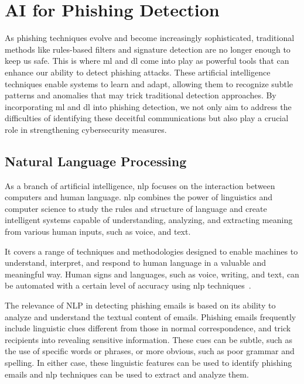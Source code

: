 
\section{AI for Phishing Detection}


As phishing techniques evolve and become increasingly sophisticated, traditional methods like rules-based filters and signature detection are no longer enough to keep us safe. This is where \ac{ml} and \ac{dl} come into play as powerful tools that can enhance our ability to detect phishing attacks. These artificial intelligence techniques enable systems to learn and adapt, allowing them to recognize subtle patterns and anomalies that may trick traditional detection approaches.
By incorporating \ac{ml} and \ac{dl} into phishing detection, we not only aim to address the difficulties of identifying these deceitful communications but also play a crucial role in strengthening cybersecurity measures.

\subsection{Natural Language Processing}


As a branch of artificial intelligence, \ac{nlp} focuses on the interaction between computers and human language. \ac{nlp} combines the power of linguistics and computer science to study the rules and structure of language and create intelligent systems capable of understanding, analyzing, and extracting meaning from various human inputs, such as voice, and text.

It covers a range of techniques and methodologies designed to enable machines to understand, interpret, and respond to human language in a valuable and meaningful way. Human signs and languages, such as voice, writing, and text, can be automated with a certain level of accuracy using \ac{nlp} techniques~\cite{Sathish20231612}.

The relevance of NLP in detecting phishing emails is based on its ability to analyze and understand the textual content of emails. Phishing emails frequently include linguistic clues different from those in normal correspondence, and trick recipients into revealing sensitive information. These cues can be subtle, such as the use of specific words or phrases, or more obvious, such as poor grammar and spelling. In either case, these linguistic features can be used to identify phishing emails and \ac{nlp} techniques can be used to extract and analyze them.

